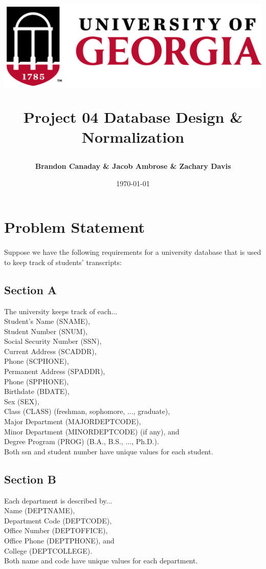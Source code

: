 \documentclass[12pt]{article}
\title{
	\begin{center}
		\includegraphics[scale=0.5]{uga.png}\\
 	\end{center}
 	Project 04
	\bigbreak Database Design \& Normalization
}
\author{\textbf{Brandon Canaday \& Jacob Ambrose \& Zachary Davis}}
\date{\today}
\newcommand\tab[1][1cm]{\hspace*{#1}}
\begin{document}
	
	\vspace{\fill}
	\maketitle
	\vspace{\fill}

	\newpage
	\tableofcontents
	\newpage

	\section{Problem Statement}
		\paragraph*{}
			Suppose we have the following requirements for a university database that is used to keep track of students’ transcripts:

		\subsection{Section A}
			The university keeps track of each...\\
				\tab Student's Name (SNAME),\\
				\tab Student Number (SNUM),\\
				\tab Social Security Number (SSN),\\
				\tab Current Address (SCADDR),\\
				\tab Phone (SCPHONE),\\
				\tab Permanent Address (SPADDR),\\
				\tab Phone (SPPHONE),\\
				\tab Birthdate (BDATE),\\
				\tab Sex (SEX),\\
				\tab Class (CLASS) (freshman, sophomore, ..., graduate),\\
				\tab Major Department (MAJORDEPTCODE),\\
				\tab Minor Department (MINORDEPTCODE) (if any), and\\
				\tab Degree Program (PROG) (B.A., B.S., ..., Ph.D.).\\ 
			Both ssn and student number have unique values for each student.

		\subsection{Section B}
			Each department is described by...\\
				\tab Name (DEPTNAME),\\
				\tab Department Code (DEPTCODE),\\
				\tab Office Number (DEPTOFFICE),\\
				\tab Office Phone (DEPTPHONE), and\\
				\tab College (DEPTCOLLEGE).\\
			Both name and code have unique values for each department.
\end{document}
